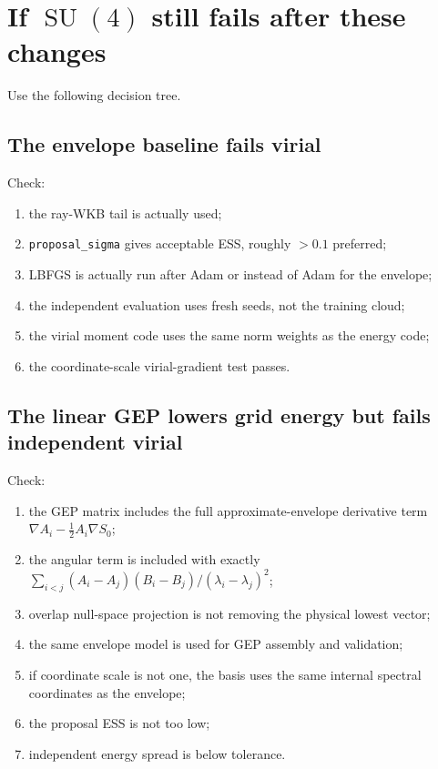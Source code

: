 \documentclass[11pt]{article}
\newcommand{\SU}{\operatorname{SU}}
\begin{document}
\section{If \(\SU(4)\) still fails after these changes}

Use the following decision tree.

\subsection{The envelope baseline fails virial}

Check:
\begin{enumerate}
\item the ray-WKB tail is actually used;
\item \texttt{proposal\_sigma} gives acceptable ESS, roughly \(>0.1\) preferred;
\item LBFGS is actually run after Adam or instead of Adam for the envelope;
\item the independent evaluation uses fresh seeds, not the training cloud;
\item the virial moment code uses the same norm weights as the energy code;
\item the coordinate-scale virial-gradient test passes.
\end{enumerate}

\subsection{The linear GEP lowers grid energy but fails independent virial}

Check:
\begin{enumerate}
\item the GEP matrix includes the full approximate-envelope derivative term
\(\nabla A_i-\frac12A_i\nabla S_0\);
\item the angular term is included with exactly
\(\sum_{i<j}(A_i-A_j)(B_i-B_j)/(\lambda_i-\lambda_j)^2\);
\item overlap null-space projection is not removing the physical lowest vector;
\item the same envelope model is used for GEP assembly and validation;
\item if coordinate scale is not one, the basis uses the same internal spectral coordinates as the envelope;
\item the proposal ESS is not too low;
\item independent energy spread is below tolerance.
\end{enumerate}
\end{document}
